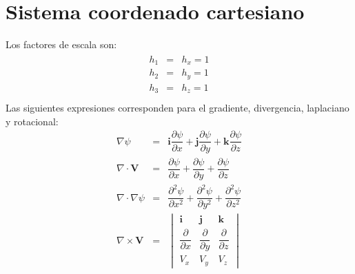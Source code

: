 \section{Sistema coordenado cartesiano}
Los factores de escala son:
\begin{align}
\begin{aligned}
h_{1} &=& h_{x} = 1 \\
h_{2} &=& h_{y} = 1 \\
h_{3} &=& h_{z} = 1 \\
\end{aligned}
\end{align}
Las siguientes expresiones corresponden para el gradiente, divergencia, laplaciano y rotacional:
\begin{eqnarray}
\nabla \psi &=& \mathbf{i} \dfrac{\partial \psi}{\partial x} + \mathbf{j} \dfrac{\partial \psi}{\partial y} + \mathbf{k} \dfrac{\partial \psi}{\partial z} \\
\nabla \cdot \mathbf{V} &=& \dfrac{\partial \psi}{\partial x} + \dfrac{\partial \psi}{\partial y} + \dfrac{\partial \psi}{\partial z} \\
\nabla \cdot \nabla \psi &=& \dfrac{\partial^{2} \psi}{\partial x^{2}} + \dfrac{\partial^{2} \psi}{\partial y^{2}} +  \dfrac{\partial^{2} \psi}{\partial z^{2}} \\
\nabla \times \mathbf{V} &=& \begin{vmatrix}
\mathbf{i} & \mathbf{j} & \mathbf{k} \\
\dfrac{\partial}{\partial x} & \dfrac{\partial}{\partial y} & \dfrac{\partial}{\partial z} \\
V_{x} & V_{y} & V_{z}
\end{vmatrix}
\end{eqnarray}
